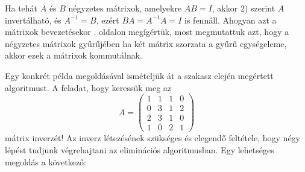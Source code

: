 \documentclass[a4paper, showtrims]{memoir}
\theoremstyle{plain}
\theoremstyle{remark}
\theoremstyle{definition}
\begin{document}
Ha tehát $A$ és $B$ négyzetes mátrixok, amelyekre $AB=I$,
akkor 2) szerint $A$ invertálható, és $A^{-1}=B$, ezért
$BA=A^{-1}A=I$ is fennáll.
Ahogyan azt a mátrixok bevezetésekor \aazt{\pageref{pg:kommutal}}. oldalon megígértük,
most megmutattuk azt, hogy a négyzetes mátrixok gyűrűjében ha két mátrix szorzata a gyűrű
egységeleme, akkor ezek a mátrixok kommutálnak.

Egy konkrét példa megoldásával ismételjük át a szakasz elején megértett algoritmust.
A feladat, hogy keressük meg az
\[
A=
\begin{pmatrix}
	1 & 1 & 1 & 0 \\
	0 & 3 & 1 & 2 \\
	2 & 3 & 1 & 0 \\
	1 & 0 & 2 & 1
\end{pmatrix}
\]
mátrix inverzét!
Az inverz létezésének szükséges és elegendő feltétele, hogy négy lépést tudjunk végrehajtani az eliminációs algoritmusban.
Egy lehetséges megoldás a következő:
\end{document}
